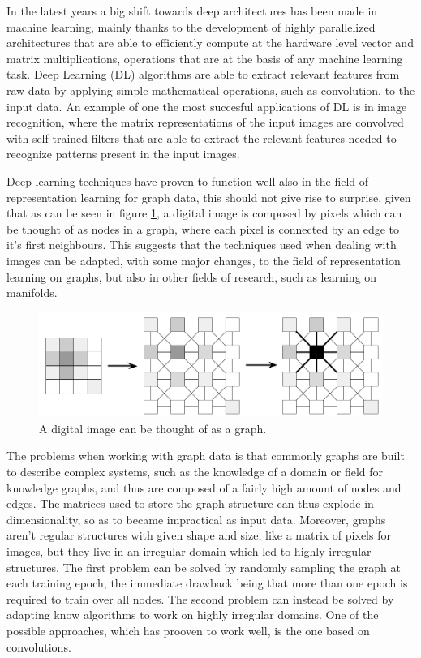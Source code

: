 \documentclass[%
    corpo=13.5pt,
    twoside,
    oldstyle,
    tipotesi=magistrale,
    greek,
    evenboxes
]{toptesi}
\begin{document}
In the latest years a big shift towards deep architectures has been made
in machine learning, mainly thanks to the development of highly
parallelized architectures that are able to efficiently compute
at the hardware level vector and matrix multiplications, operations that
are at the basis of any machine learning task.
Deep Learning (DL) algorithms are able to extract relevant features from
raw data by applying simple mathematical operations, such as convolution, to
the input data.
An example of one the most succesful applications of DL is in
image recognition, where the matrix representations of the input
images are convolved with self-trained filters that are able to
extract the relevant features needed to recognize patterns present
in the input images.

Deep learning techniques have proven to function well also in the field of
representation learning for graph data, this should not give rise to surprise,
given that as can be seen in figure \ref{fig:pixels-as-graph}, a digital image
is composed by pixels which can be thought of as nodes in a graph, where
each pixel is connected by an edge to it's first neighbours. This suggests that
the techniques used when dealing with images can be adapted, with
some major changes, to the field of representation learning on graphs, but
also in other fields of research, such as learning on manifolds.


\begin{figure}[h]
    \centering
    \includegraphics[scale=0.4]{img/pixels-as-graph.png}
    \caption{A digital image can be thought of as a graph.}
    \label{fig:pixels-as-graph}
\end{figure}

The problems when working with graph data is that commonly graphs
are built to describe complex systems, such as the knowledge of a
domain or field for knowledge graphs, and thus are composed of
a fairly high amount of nodes and edges. The matrices used to
store the graph structure can thus explode in dimensionality, so as
to became impractical as input data. Moreover, graphs aren't
regular structures with given shape and size, like a matrix of pixels
for images, but they live in an irregular domain which led to highly
irregular structures.
The first problem can be solved by randomly sampling the graph at each
training epoch, the immediate drawback being that more than one epoch
is required to train over all nodes. The second problem can instead be
solved by adapting know algorithms to work on highly irregular domains.
One of the possible approaches, which has prooven to work well, is
the one based on convolutions.
\end{document}
